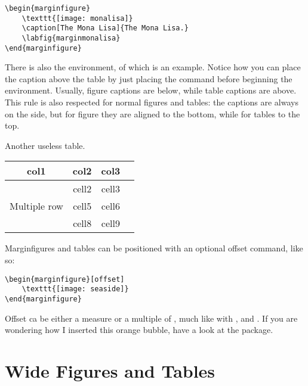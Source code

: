 \begin{lstlisting}[caption={Another caption.}]
\begin{marginfigure}
	\texttt{[image: monalisa]}
	\caption[The Mona Lisa]{The Mona Lisa.}
	\labfig{marginmonalisa}
\end{marginfigure}
\end{lstlisting}

There is also the  environment, of which 
 is an example. Notice how you can place the 
caption above the table by just placing the  command 
before beginning the  environment. Usually, figure 
captions are below, while table captions are above. This rule is also 
respected for normal figures and tables: the captions are always on the 
side, but for figure they are aligned to the bottom, while for tables to 
the top.

\begin{margintable}
\caption[Another useless table]{Another useless table.}
\raggedright
\begin{tabular}{ c c c c }
	\hline
	col1 & col2 & col3 \\
	\hline
	\multirow{3}{4em}{Multiple row} & cell2 & cell3 \\ & cell5 & cell6 
	\\ & cell8 & cell9 \\ \hline
\end{tabular}
\end{margintable}

Marginfigures and tables can be positioned with an optional offset 
command, like so:

\begin{lstlisting}
\begin{marginfigure}[offset]
	\texttt{[image: seaside]}
\end{marginfigure}
\end{lstlisting}

Offset ca be either a measure or a multiple of , 
much like with ,  and 
. If you are wondering how I 
inserted this orange bubble, have a look at the  package.

\section{Wide Figures and Tables}

